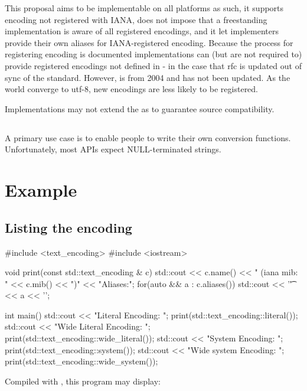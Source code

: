 \documentclass{wg21}
\begin{document}
This proposal aims to be implementable on all platforms as such, it supports encoding not registered with IANA, does not impose that
a freestanding implementation is aware of all registered encodings, and it let implementers provide their own aliases for IANA-registered encoding.
Because the process for registering encoding is documented \cite{rfc2978} implementations can (but are not required to) provide
registered encodings not defined in \cite{rfc3808} - in the case that rfc is updated out of sync of the standard.
However, \cite{rfc3808} is from 2004 and has not been updated. As the world converge to utf-8, new encodings are less likely to
be registered.

Implementations may not extend the  as to guarantee source compatibility.

\subsection{}

A primary use case is to enable people to write their own conversion functions.
Unfortunately, most APIs expect NULL-terminated strings.

\section{Example}

\subsection{Listing the encoding}

\begin{codeblock}

#include <text_encoding>
#include <iostream>

void print(const std::text_encoding & c) {
	std::cout << c.name()
	<< " (iana mib: " << c.mib() << ")\n"
	<< "Aliases:\n";
	for(auto && a : c.aliases()) {
		std::cout << '\t' << a << '\n';
	}
}

int main() {
	std::cout << "Literal Encoding: ";
	print(std::text_encoding::literal());
	std::cout << "Wide Literal Encoding: ";
	print(std::text_encoding::wide_literal());
	std::cout << "System Encoding: ";
	print(std::text_encoding::system());
	std::cout << "Wide system Encoding: ";
	print(std::text_encoding::wide_system());
}
\end{codeblock}

Compiled with , this program may display:
\end{document}
